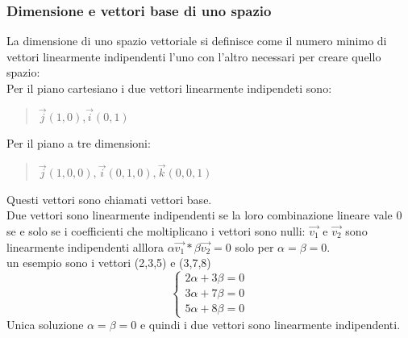 \documentclass[a4paper]{article}
\begin{document}
\subsubsection{Dimensione e vettori base di uno spazio}
La dimensione di uno spazio vettoriale si definisce come il numero minimo di vettori linearmente indipendenti l'uno con l'altro necessari per creare quello spazio:
\\ Per il piano cartesiano i due vettori linearmente indipendeti sono: 
\begin{quote} \centering$\vec{j}(1,0)$,$\vec{i}(0,1) $
\end{quote}
Per il piano a tre dimensioni: 
\begin{quote} \centering $ \vec{j}(1,0,0), \vec{i}(0,1,0), \vec{k}(0,0,1) $
\end{quote}
Questi vettori sono chiamati vettori base.
\\Due vettori sono linearmente indipendenti se la loro combinazione lineare vale 0 se e solo se i coefficienti che moltiplicano i vettori sono nulli:
$\vec{v_{1}}$ e $\vec{v_{2}} $ sono linearmente indipendenti alllora $\alpha\vec{v_{1}}*\beta\vec{v_{2}}=0$ solo per $\alpha=\beta=0 $.
\\ un esempio sono i vettori (2,3,5) e (3,7,8) \\
\[\begin{cases}
2\alpha + 3\beta=0\\
3\alpha + 7\beta=0\\
5\alpha + 8\beta=0
\end{cases}
\]
Unica soluzione $\alpha=\beta=0$ e quindi i due vettori sono linearmente indipendenti.
\\
\end{document}
